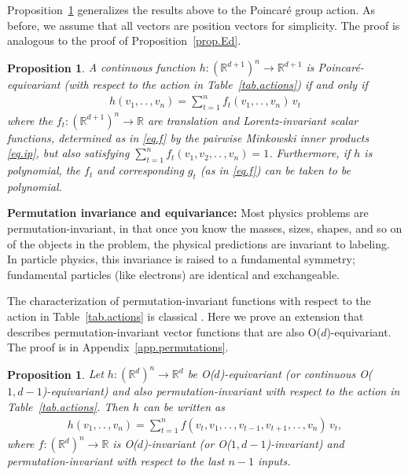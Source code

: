 \documentclass{article}
\renewcommand{\paragraph}[1]{\par\textbf{#1}}
\theoremstyle{Hogg}
\newtheorem{proposition}[theorem]{Proposition}
\renewcommand{\ldots}{.\,.\,}
\renewcommand{\cdots}{\ldots}
\begin{document}
Proposition~\ref{prop.poincare} generalizes the results above to the Poincar\'e group action. As before, we assume that all vectors are position vectors for simplicity. The proof is analogous to the proof of Proposition~\ref{prop.Ed}.
\begin{proposition} \label{prop.poincare}
A continuous function $h:(\mathbb R^{d+1})^n \to \mathbb R^{d+1}$ is Poincaré-equivariant (with respect to the action in Table~\ref{tab.actions}) if and only if 
\begin{align}
    h(v_1,\ldots,v_n) = \textstyle\sum_{t=1}^n f_t(v_1, \ldots, v_n)\,v_t
\end{align}
where the $f_t:(\mathbb R^{d+1})^n \to \mathbb R$ are translation and Lorentz-invariant scalar functions, determined as in \eqref{eq.f} by the pairwise Minkowski inner products \eqref{eq.ip}, but also satisfying $\sum_{t=1}^nf_t(v_1, v_2, \cdots, v_n)=1$. Furthermore, if $h$ is polynomial, the $f_t$ and corresponding $g_t$ (as in \eqref{eq.f}) can be taken to be polynomial.
\end{proposition}


\paragraph{Permutation invariance and equivariance:}
Most physics problems are permutation-invariant, in that once you know the masses, sizes, shapes, and so on of the objects in the problem, the physical predictions are invariant to labeling.
In particle physics, this invariance is raised to a fundamental symmetry; fundamental particles (like electrons) are identical and exchangeable.

The characterization of permutation-invariant functions with respect to the action in Table~\ref{tab.actions} is classical \cite[pp.~36--39]{weyl}. Here we prove an extension that describes permutation-invariant vector functions that are also O($d$)-equivariant. The proof is in Appendix~\ref{app.permutations}.

\begin{proposition}\label{lemma.permutations}
Let $h:(\mathbb R^d)^n\to \mathbb R^{d}$ be O($d$)-equivariant (or continuous O($1,d-1$)-equivariant) and also permutation-invariant with respect to the action in Table~\ref{tab.actions}. Then $h$ can be written as
\begin{eqnarray}
   h(v_1,\ldots, v_n)=  \textstyle\sum_{t=1}^n f(v_t, v_1,\ldots,v_{t-1},v_{t+1}, \ldots, v_n)\,v_t, 
\end{eqnarray}
where $f:(\mathbb R^d)^n\to \mathbb R$ is O($d$)-invariant (or  O($1,d-1$)-invariant) and permutation-invariant with respect to the last $n-1$ inputs.%
\end{proposition}
\end{document}
